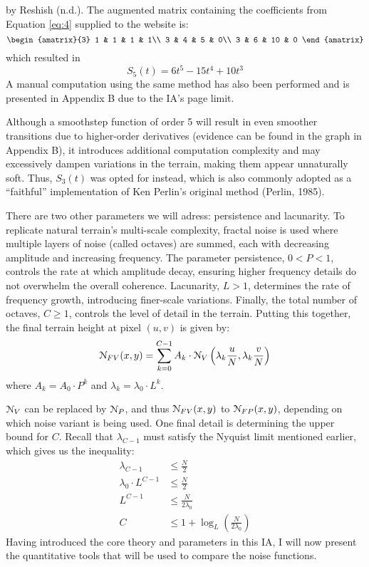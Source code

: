 by Reshish (n.d.). The augmented matrix containing the coefficients from Equation \ref{eq:4} supplied to the website is:
\begin{equation*}
    \begin{amatrix}{3}
        1 & 1 & 1 & 1\\
        3 & 4 & 5 & 0\\
        3 & 6 & 10 & 0
    \end{amatrix}
\end{equation*}
which resulted in
\[S_5(t)=6t^5-15t^4+10t^3\]
A manual computation using the same method has also been performed and is presented in Appendix B due to the IA's page limit. 

Although a smoothstep function of order 5 will result in even smoother transitions due to higher-order derivatives (evidence can be found in the 
graph in Appendix B), it introduces additional computation complexity and may excessively dampen variations in the terrain, making them appear 
unnaturally soft. Thus, $S_3(t)$ was opted for instead, which is also commonly adopted as a “faithful” implementation of Ken Perlin's original 
method (Perlin, 1985).

There are two other parameters we will adress: persistence and lacunarity. To replicate natural terrain's multi-scale complexity, fractal noise is used where multiple 
layers of noise (called octaves) are summed, each with decreasing amplitude and increasing frequency. The parameter persistence, $0<P<1$, controls the rate at which 
amplitude decay, ensuring higher frequency details do not overwhelm the overall coherence. Lacunarity, $L>1$, determines the rate of frequency growth, introducing 
finer-scale variations. Finally, the total number of octaves, $C\ge 1$, controls the level of 
detail in the terrain. Putting this together, the final terrain height at pixel $(u,v)$ is given by:
\[\EuScript{N}_{FV}(x,y)=\sum_{k=0}^{C-1}A_k\cdot\EuScript{N}_V\left(\lambda_k\frac{u}{N},\lambda_k\frac{v}{N}\right)\]
where $A_k=A_0\cdot P^k$ and $\lambda_k=\lambda_0\cdot L^k$.

$\EuScript{N}_V$ can be replaced by $\EuScript{N}_P$, and thus $\EuScript{N}_{FV}(x,y)$ to $\EuScript{N}_{FP}(x,y)$, depending on which noise variant 
is being used. One final detail is determining the upper bound for $C$. Recall that $\lambda_{C-1}$ must satisfy the Nyquist limit mentioned earlier, 
which gives us the inequality:
\begin{align*}
    \lambda_{C-1}&\le \frac{N}{2}\\
    \lambda_0\cdot L^{C-1} &\le \frac{N}{2}\\
    L^{C-1} &\le \frac{N}{2\lambda_0}\\
    C &\le 1+\log_L\left(\frac{N}{2\lambda_0}\right)
\end{align*}
Having introduced the core theory and parameters in this IA, I will now present the quantitative tools that will be used to compare the noise functions.

